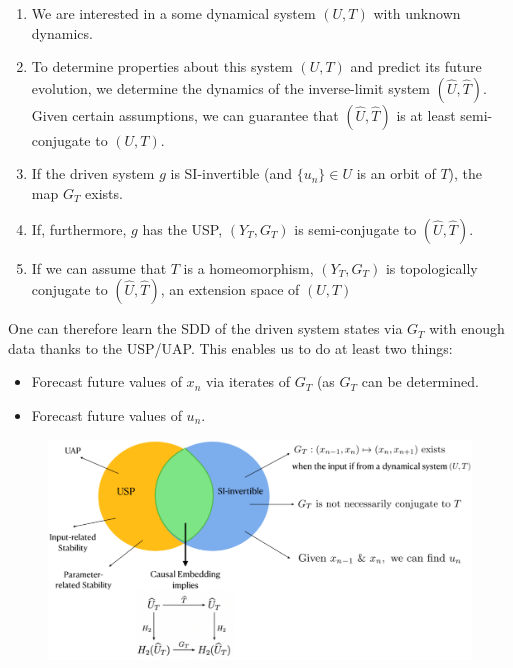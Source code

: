 \documentclass[a4paper,12pt,twoside]{report}
\begin{document}
\vspace{-8mm}
\begin{enumerate}
\item We are interested in a some dynamical system $(U,T)$ with unknown dynamics.
\item To determine properties about this system $(U,T)$ and predict its future evolution, we determine the dynamics of the inverse-limit system $(\widehat{U}, \widehat{T})$. Given certain assumptions, we can guarantee that $(\widehat{U}, \widehat{T})$ is at least semi-conjugate to $(U,T)$.
\item If the driven system $g$ is SI-invertible (and $\{u_n\}\in{U}$  is an orbit of $T$), the map $G_T$ exists. 
\item If, furthermore, $g$ has the USP, $(Y_T, G_T)$ is semi-conjugate to $(\widehat{U}, \widehat{T})$.
\item If we can assume that $T$ is a homeomorphism, $(Y_T, G_T)$ is topologically conjugate to $(\widehat{U}, \widehat{T})$, an extension space of $(U,T)$
\end{enumerate} 

One can therefore learn the SDD of the driven system states via $G_T$ with enough data thanks to the USP/UAP. This enables us to do at least two things: 
\vspace{-8mm}
\begin{itemize}
\item Forecast future values of $x_n$ via iterates of $G_T$ (as $G_T$ can be determined.
\item Forecast future values of $u_n$. 
\end{itemize} 


\begin{figure}[ht]
  \includegraphics[scale=0.3]{_summarypictorial.eps}
  \centering
  \label{fig:fig_pictorialSummary}
\end{figure}
\end{document}
